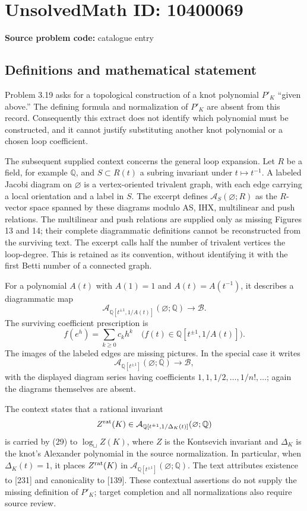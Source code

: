 \documentclass[11pt]{article}
\newcommand{\Q}{\mathbb{Q}}
\begin{document}
\section*{UnsolvedMath ID: 10400069}
\textbf{Source problem code:} catalogue entry
\subsection{Definitions and mathematical statement}
Problem 3.19 asks for a topological construction of a knot polynomial \(P'_K\) ``given above.'' The defining formula and normalization of \(P'_K\) are absent from this record. Consequently this extract does not identify which polynomial must be constructed, and it cannot justify substituting another knot polynomial or a chosen loop coefficient.

The subsequent supplied context concerns the general loop expansion. Let \(R\) be a field, for example \(\Q\), and \(S\subset R(t)\) a subring invariant under \(t\mapsto t^{-1}\). A labeled Jacobi diagram on \(\varnothing\) is a vertex-oriented trivalent graph, with each edge carrying a local orientation and a label in \(S\). The excerpt defines \(\mathcal A_S(\varnothing;R)\) as the \(R\)-vector space spanned by these diagrams modulo AS, IHX, multilinear and push relations. The multilinear and push relations are supplied only as missing Figures 13 and 14; their complete diagrammatic definitions cannot be reconstructed from the surviving text. The excerpt calls half the number of trivalent vertices the loop-degree. This is retained as its convention, without identifying it with the first Betti number of a connected graph.

For a polynomial \(A(t)\) with \(A(1)=1\) and \(A(t)=A(t^{-1})\), it describes a diagrammatic map
\[
 \mathcal A_{\Q[t^{\pm1},1/A(t)]}(\varnothing;\Q)
      \longrightarrow\mathcal B.\tag{29}
\]
The surviving coefficient prescription is
\[
 f(e^h)=\sum_{k\ge0}c_kh^k
       \quad\bigl(f(t)\in\Q[t^{\pm1},1/A(t)]\bigr).
\]
The images of the labeled edges are missing pictures. In the special case it writes
\[
 \mathcal A_{\Q[t^{\pm1}]}(\varnothing;\Q)
       \longrightarrow\mathcal B,\tag{30}
\]
with the displayed diagram series having coefficients \(1,1,1/2,\ldots,1/n!,\ldots\); again the diagrams themselves are absent.

The context states that a rational invariant
\[
 Z^{\rm rat}(K)\in
 \mathcal A_{\Q[t^{\pm1},1/\Delta_K(t)]}(\varnothing;\Q)
\]
is carried by (29) to \(\log_{\sqcup}Z(K)\), where \(Z\) is the Kontsevich invariant and \(\Delta_K\) is the knot's Alexander polynomial in the source normalization. In particular, when \(\Delta_K(t)=1\), it places \(Z^{\rm rat}(K)\) in \(\mathcal A_{\Q[t^{\pm1}]}(\varnothing;\Q)\). The text attributes existence to [231] and canonicality to [139]. These contextual assertions do not supply the missing definition of \(P'_K\); target completion and all normalizations also require source review.
\end{document}
